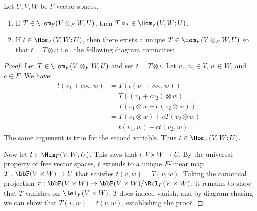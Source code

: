    \begin{theorem}
        Let $U,V,W$ be $F$-vector spaces.
            \begin{enumerate}[label = (\arabic*)]
                \item If $T \in \Hom_F(V \otimes_F W, U)$, then $T \circ \iota \in \Hom_F(V,W;U)$. 
                \item If $t \in \Hom_F(V,W;U)$, then there exists a unique $T \in \Hom_F(V \otimes_F W,U)$ so that $t = T \otimes \iota$; i.e., the following diagram commutes:
                    \begin{center}
                    \end{center}
            \end{enumerate}
    \end{theorem}
        \begin{proof}
            Let $T \in \Hom_F(V \otimes_F W, U)$ and set $t = T \otimes \iota$. Let $v_1,v_2 \in V$, $w \in W$, and $c \in F$. We have:
                \begin{equation*}
                \begin{split}
                    t(v_1 +cv_2 , w) 
                    &= T(\iota(v_1 + cv_2,w)) \\
                    &= T((v_1 + cv_2) \otimes w) \\
                    & = T(v_1 \otimes w + c(v_2 \otimes w)) \\
                    & = T(v_1 \otimes w) + cT(v_2 \otimes w) \\
                    &= t(v_1,w) + ct(v_2,w).
                \end{split}
                \end{equation*}
            The same argument is true for the second variable. Thus $t \in \Hom_F(V,W;U)$.

            Now let $t\in \Hom_F(V,W;U)$. This says that $t:V \times W \rightarrow U$. By the universal property of free vector spaces, $t$ extends to a unique $F$-linear map $T: \bbF(V \times W) \rightarrow U$ that satisfies $t(v,w) = T(v,w)$. Taking the canonical projection $\pi:\bbF(V \times W) \rightarrow \bbF(V \times W)/\Rel_F(V \times W)$, it remains to show that $T$ vanishes on $\Rel_F(V \times W)$. $T$ does indeed vanish, and by diagram chasing we can show that $T(v,w) = t(v,w)$, establishing the proof.
        \end{proof}

